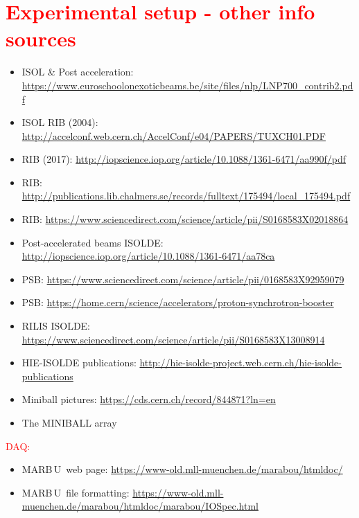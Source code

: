 \documentclass[twoside,english]{uiofysmaster/uiofysmaster}
\newcommand{\MBOU}{MAR\belowbaseline[-2pt]{a}B\stackinset{l}{3pt}{b}{-3pt}{O}{O}\,U}
\begin{document}
\section*{\textcolor{red}{Experimental setup - other info sources}}
\begin{itemize}
	\item ISOL \& Post acceleration: \url{https://www.euroschoolonexoticbeams.be/site/files/nlp/LNP700_contrib2.pdf}
	\item ISOL RIB (2004): \url{http://accelconf.web.cern.ch/AccelConf/e04/PAPERS/TUXCH01.PDF}
	\item RIB (2017): \url{http://iopscience.iop.org/article/10.1088/1361-6471/aa990f/pdf}
	\item RIB: \url{http://publications.lib.chalmers.se/records/fulltext/175494/local_175494.pdf}
	\item RIB: \url{https://www.sciencedirect.com/science/article/pii/S0168583X02018864}
	\item Post-accelerated beams ISOLDE: \url{http://iopscience.iop.org/article/10.1088/1361-6471/aa78ca}
	\item PSB: \url{https://www.sciencedirect.com/science/article/pii/0168583X92959079}
	\item PSB: \url{https://home.cern/science/accelerators/proton-synchrotron-booster}
	\item RILIS ISOLDE: \url{https://www.sciencedirect.com/science/article/pii/S0168583X13008914}
	\item HIE-ISOLDE publications: \url{http://hie-isolde-project.web.cern.ch/hie-isolde-publications}
	\item Miniball pictures: \url{https://cds.cern.ch/record/844871?ln=en}
	\item The MINIBALL array \cite{MBarray}
\end{itemize}

\textcolor{red}{DAQ:}
\begin{itemize}
	\item \MBOU\ web page: \url{https://www-old.mll-muenchen.de/marabou/htmldoc/}
	\item \MBOU\ file formatting: \url{https://www-old.mll-muenchen.de/marabou/htmldoc/marabou/IOSpec.html}
\end{itemize}
\end{document}

